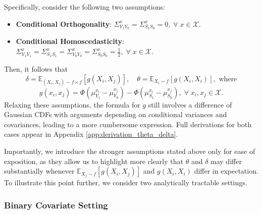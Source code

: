 \documentclass[referee,usenatbib]{biom}
\newcommand{\E}{\mathbb{E}}
\begin{document}
Specifically, consider the following two assumptions:
\begin{itemize}[leftmargin=*]
    \item \textbf{Conditional Orthogonality}:
    \( \Sigma^{x}_{Y_{1} Y_{0}} = \Sigma^{x}_{S_{1} S_{0}} = 0, \; \forall \; x \in \mathcal{X}. \)
    \item \textbf{Conditional Homoscedasticity}:
    \( \Sigma^{x}_{Y_{1} Y_{1}} = \Sigma^{x}_{S_{1} S_{1}} = \Sigma^{x}_{Y_{0} Y_{0}} = \Sigma^{x}_{S_{0} S_{0}} = \frac{1}{2}, \; \forall \; x \in \mathcal{X}. \)
\end{itemize}
Then, it follows that
\begin{equation*}
    \delta = \E_{(X_{i}, X_{j}) \sim f \times f} \!\left[ g(X_{i}, X_{j})\right], \quad \theta = \E_{X_{i} \sim f} \!\left[ g(X_{i}, X_{i}) \right], \text{ where}
\end{equation*}
\begin{equation*}
    g(x_{i}, x_{j}) = \Phi \left( \mu^{x_{i}}_{Y_{1}} - \mu^{x_{j}}_{Y_{0}} \right) - \Phi \left( \mu^{x_{i}}_{S_{1}} - \mu^{x_{j}}_{S_{0}} \right), \; \forall \; x_{i}, x_{j} \in \mathcal{X}.
\end{equation*}
Relaxing these assumptions, the formula for \(g\) still involves a difference of Gaussian CDFs with arguments depending on conditional variances and covariances, leading to a more cumbersome expression. Full derivations for both cases appear in Appendix \ref{app:derivation_theta_delta}.

Importantly, we introduce the stronger assumptions stated above only for ease of exposition, as they allow us to highlight more clearly that \(\theta\) and \(\delta\) may differ substantially whenever \(\E_{X_{j} \sim f} \left[ g(X_{i}, X_{j}) \right]\) and \(g(X_{i}, X_{i})\) differ in expectation. To illustrate this point further, we consider two analytically tractable settings.

\subsubsection{Binary Covariate Setting}
\label{subsec:binary_covariate_setting}
\end{document}

